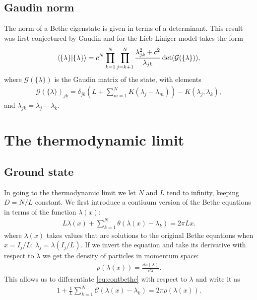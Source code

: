 \documentclass[11pt, a4paper]{report} %
\begin{document}
\subsection{Gaudin norm}
The norm of a Bethe eigenstate is given in terms of a determinant.
This result was first conjectured by Gaudin and for the Lieb-Liniger model takes the form~\cite{Caux2007}
\begin{align}
  \braket{\{\lambda\}}{\{\lambda\}} = c^N \prod_{k=1}^N \prod_{j=k+1}^N \frac{\lambda_{jk}^2 + c^2}{\lambda_{jk}} \det(\mathcal{G}(\{\lambda\})),
\end{align}
where $\mathcal{G}(\{\lambda\})$ is the Gaudin matrix of the state, with elements
\begin{align}\label{eq:gaudin}
  \mathcal{G}(\{\lambda\})_{jk} = \delta_{jk} \left(L + \sum_{m=1}^{N}K(\lambda_j-\lambda_m)\right) - K(\lambda_j, \lambda_k),
\end{align}
and \(\lambda_{jk} = \lambda_j-\lambda_k\).


\section{The thermodynamic limit}
\subsection{Ground state}
In going to the thermodynamic limit we let \(N\) and \(L\) tend to infinity, keeping \(D=N/L\) constant.
We first introduce a contiuum version of the Bethe equations in terms of the function \(\lambda(x)\):
\begin{align}
  \label{eq:contbethe}
  L \lambda(x) + \sum_{k=1}^N\theta(\lambda(x)-\lambda_k) = 2 \pi L x.
\end{align}
where \(\lambda(x)\) takes values that are solutions to the original Bethe equations when \(x=I_j/L\): \(\lambda_j=\lambda(I_j/L)\).
If we invert the equation and take its derivative with respect to \(\lambda\) we get the density of particles in momentum space:
\begin{align}
  \rho(\lambda(x)) = \frac{\dd x(\lambda)}{\dd \lambda}.
\end{align}
This allows us to differentiate \cref{eq:contbethe} with respect to \(\lambda\) and write it as 
\begin{align}
  1+\frac{1}{L} \sum_{k=1}^{N} \mathcal{C}(\lambda(x)- \lambda_k) = 2\pi \rho(\lambda(x)).
\end{align}
\end{document}

